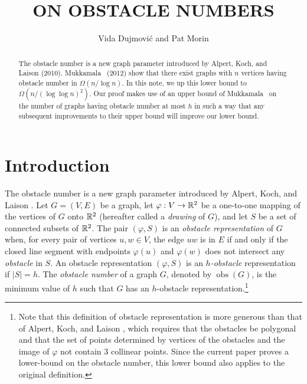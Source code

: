 \documentclass{patmorin}
\title{\MakeUppercase{On Obstacle Numbers}}
\author{Vida Dujmovi\'c and Pat Morin}
\DeclareMathOperator{\obs}{obs}
\renewcommand{\note}[1]{}
\begin{document}
\begin{titlepage}
\maketitle

\begin{abstract}
\setlength{\baselineskip}{16.8pt}
The obstacle number is a new graph parameter introduced by Alpert, Koch,
and Laison (2010).  Mukkamala \etal\ (2012) show that there exist graphs
with $n$ vertices having obstacle number in $\Omega(n/\log n)$. In this
note, we up this lower bound to $\Omega(n/(\log\log n)^2)$.  Our proof
makes use of an upper bound of Mukkamala \etal\ on the number of graphs
having obstacle number at most $h$ in such a way that any subsequent
improvements to their upper bound will improve our lower bound.
\end{abstract}
\end{titlepage}


\section{Introduction}

\setlength{\baselineskip}{16.8pt}
The obstacle number is a new graph parameter introduced by Alpert, Koch,
and Laison \cite{alpert.koch.ea:obstacle}.  Let $G=(V,E)$ be a graph,
let $\varphi:V\to \mathbb{R}^2$ be a one-to-one mapping of the vertices of
$G$ onto $\mathbb{R}^2$ (hereafter called a \emph{drawing} of $G$), and let $S$
be a set of connected subsets of $\mathbb{R}^2$.  The pair $(\varphi,S)$ is an
\emph{obstacle representation} of $G$ when, for every pair of vertices
$u,w\in V$, the edge $uw$ is in $E$ if and only if the closed line
segment with endpoints $\varphi(u)$ and $\varphi(w)$ does not intersect
any \emph{obstacle} in $S$.\note{Changing open to closed handles obstacles
that sneak through vertices.}  An obstacle representation $(\varphi,S)$
is an \emph{$h$-obstacle} representation if $|S|=h$.  The \emph{obstacle
number} of a graph $G$, denoted by $\obs(G)$, is the minimum value of $h$
such that $G$ has an $h$-obstacle representation.\footnote{Note that
this definition of obstacle representation is more generous than that of Alpert, Koch, and Laison \cite{alpert.koch.ea:obstacle}, which requires that the obstacles be polygonal and that the
set of points determined by vertices of the obstacles and the image of $\varphi$ not contain 3 collinear points. Since the current
paper proves a lower-bound on the obstacle number, this lower bound
also applies to the original definition.}
\note{Obstacles that intersect each other is fine.}
\note{Changed $w(n)$ to $\obs(n)$}
\end{document}
